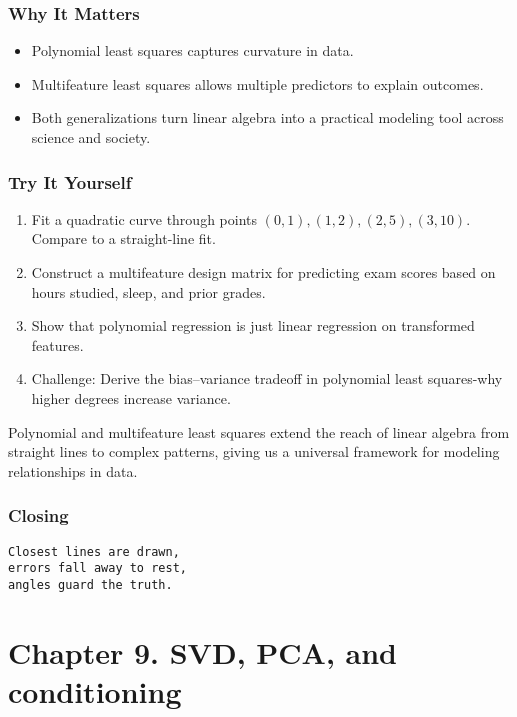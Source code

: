 \documentclass[
  letterpaper,
  DIV=11,
  numbers=noendperiod]{scrreprt}
\providecommand{\tightlist}{%
  \setlength{\itemsep}{0pt}\setlength{\parskip}{0pt}}
\begin{document}
\subsubsection{Why It Matters}\label{why-it-matters-76}

\begin{itemize}
\tightlist
\item
  Polynomial least squares captures curvature in data.
\item
  Multifeature least squares allows multiple predictors to explain
  outcomes.
\item
  Both generalizations turn linear algebra into a practical modeling
  tool across science and society.
\end{itemize}

\subsubsection{Try It Yourself}\label{try-it-yourself-79}

\begin{enumerate}
\def\labelenumi{\arabic{enumi}.}
\tightlist
\item
  Fit a quadratic curve through points \((0,1), (1,2), (2,5), (3,10)\).
  Compare to a straight-line fit.
\item
  Construct a multifeature design matrix for predicting exam scores
  based on hours studied, sleep, and prior grades.
\item
  Show that polynomial regression is just linear regression on
  transformed features.
\item
  Challenge: Derive the bias--variance tradeoff in polynomial least
  squares-why higher degrees increase variance.
\end{enumerate}

Polynomial and multifeature least squares extend the reach of linear
algebra from straight lines to complex patterns, giving us a universal
framework for modeling relationships in data.

\subsubsection{Closing}\label{closing-7}

\begin{verbatim}
Closest lines are drawn,
errors fall away to rest,
angles guard the truth.
\end{verbatim}

\section{Chapter 9. SVD, PCA, and
conditioning}\label{chapter-9.-svd-pca-and-conditioning-1}
\end{document}
